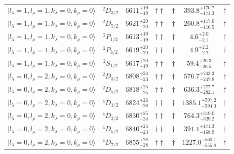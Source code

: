 \begin{tabular}{c c| c c c c c }
$\vert l_{\lambda}\!\!=\!1, l_{\rho}\!\!=\!1, k_{\lambda}\!\!=\!0, k_{\rho}\!\!=\!0 \rangle$ & $^{2}D_{3/2}$ & $6611^{+19}_{-19}$ & $\dagger\dagger$ & $\dagger$ & $393.8^{+170.7}_{-171.3}$ & $\dagger$ \\ 
$\vert l_{\lambda}\!\!=\!1, l_{\rho}\!\!=\!1, k_{\lambda}\!\!=\!0, k_{\rho}\!\!=\!0 \rangle$ & $^{2}D_{5/2}$ & $6621^{+20}_{-20}$ & $\dagger\dagger$ & $\dagger$ & $260.8^{+117.0}_{-116.5}$ & $\dagger$ \\ 
$\vert l_{\lambda}\!\!=\!1, l_{\rho}\!\!=\!1, k_{\lambda}\!\!=\!0, k_{\rho}\!\!=\!0 \rangle$ & $^{2}P_{1/2}$ & $6613^{+19}_{-19}$ & $\dagger\dagger$ & $\dagger$ & $4.6^{+2.0}_{-2.1}$ & $\dagger$ \\ 
$\vert l_{\lambda}\!\!=\!1, l_{\rho}\!\!=\!1, k_{\lambda}\!\!=\!0, k_{\rho}\!\!=\!0 \rangle$ & $^{2}P_{3/2}$ & $6619^{+20}_{-20}$ & $\dagger\dagger$ & $\dagger$ & $4.9^{+2.2}_{-2.2}$ & $\dagger$ \\ 
$\vert l_{\lambda}\!\!=\!1, l_{\rho}\!\!=\!1, k_{\lambda}\!\!=\!0, k_{\rho}\!\!=\!0 \rangle$ & $^{2}S_{1/2}$ & $6617^{+20}_{-19}$ & $\dagger\dagger$ & $\dagger$ & $59.4^{+26.3}_{-26.5}$ & $\dagger$ \\ 
$\vert l_{\lambda}\!\!=\!0, l_{\rho}\!\!=\!2, k_{\lambda}\!\!=\!0, k_{\rho}\!\!=\!0 \rangle$ & $^{2}D_{3/2}$ & $6808^{+24}_{-23}$ & $\dagger\dagger$ & $\dagger$ & $576.7^{+243.3}_{-247.8}$ & $\dagger$ \\ 
$\vert l_{\lambda}\!\!=\!0, l_{\rho}\!\!=\!2, k_{\lambda}\!\!=\!0, k_{\rho}\!\!=\!0 \rangle$ & $^{2}D_{5/2}$ & $6818^{+25}_{-25}$ & $\dagger\dagger$ & $\dagger$ & $636.3^{+277.7}_{-282.1}$ & $\dagger$ \\ 
$\vert l_{\lambda}\!\!=\!0, l_{\rho}\!\!=\!2, k_{\lambda}\!\!=\!0, k_{\rho}\!\!=\!0 \rangle$ & $^{4}D_{1/2}$ & $6824^{+26}_{-26}$ & $\dagger\dagger$ & $\dagger$ & $1385.1^{+597.2}_{-594.0}$ & $\dagger$ \\ 
$\vert l_{\lambda}\!\!=\!0, l_{\rho}\!\!=\!2, k_{\lambda}\!\!=\!0, k_{\rho}\!\!=\!0 \rangle$ & $^{4}D_{3/2}$ & $6830^{+25}_{-24}$ & $\dagger\dagger$ & $\dagger$ & $764.3^{+319.0}_{-329.2}$ & $\dagger$ \\ 
$\vert l_{\lambda}\!\!=\!0, l_{\rho}\!\!=\!2, k_{\lambda}\!\!=\!0, k_{\rho}\!\!=\!0 \rangle$ & $^{4}D_{5/2}$ & $6840^{+24}_{-23}$ & $\dagger\dagger$ & $\dagger$ & $391.1^{+171.3}_{-168.9}$ & $\dagger$ \\ 
$\vert l_{\lambda}\!\!=\!0, l_{\rho}\!\!=\!2, k_{\lambda}\!\!=\!0, k_{\rho}\!\!=\!0 \rangle$ & $^{4}D_{7/2}$ & $6855^{+28}_{-28}$ & $\dagger\dagger$ & $\dagger$ & $1227.0^{+560.1}_{-555.8}$ & $\dagger$ \\ 
\hline \hline
\end{tabular}
